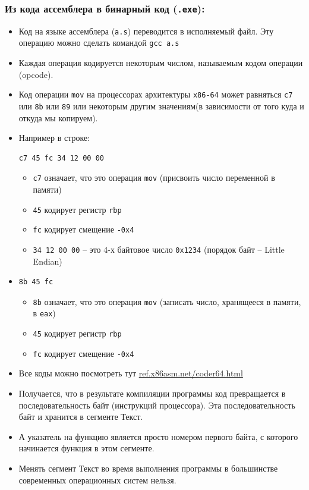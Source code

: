 \documentclass{article}
\begin{document}
\subsubsection*{Из кода ассемблера в бинарный код (\texttt{.exe}):}
\begin{itemize}
\item Код на языке ассемблера (\texttt{a.s}) переводится в исполняемый файл. Эту операцию можно сделать командой \texttt{gcc a.s}
\item Каждая операция кодируется некоторым числом, называемым кодом операции (opcode).
\item Код операции \texttt{mov} на процессорах архитектуры \texttt{x86-64} может равняться \texttt{с7} или \texttt{8b} или \texttt{89} или некоторым другим  значениям(в зависимости от того куда и откуда мы копируем).
\item Например в строке:
\begin{verbatim}
c7 45 fc 34 12 00 00
\end{verbatim}
\begin{itemize}
\item \texttt{с7} означает, что это операция \texttt{mov} (присвоить число переменной в памяти)
\item \texttt{45} кодирует регистр \texttt{rbp}
\item \texttt{fc} кодирует смещение \texttt{-0x4}
\item \texttt{34 12 00 00} -- это 4-х байтовое число \texttt{0x1234} (порядок байт -- Little Endian)
\end{itemize}

\item
\begin{verbatim}
8b 45 fc
\end{verbatim}
\begin{itemize}
\item \texttt{8b} означает, что это операция \texttt{mov} (записать число, хранящееся в памяти, в \texttt{eax})
\item \texttt{45} кодирует регистр \texttt{rbp}
\item \texttt{fc} кодирует смещение \texttt{-0x4}
\end{itemize}

\item Все коды можно посмотреть тут \href{http://ref.x86asm.net/coder64.html}{ref.x86asm.net/coder64.html}
\item Получается, что в результате компиляции программы код превращается в последовательность байт (инструкций процессора). Эта последовательность байт и хранится в сегменте Текст.
\item А указатель на функцию является просто номером первого байта, с которого начинается функция в этом сегменте.
\item Менять сегмент Текст во время выполнения программы в большинстве современных операционных систем нельзя. 
\end{itemize}
\end{document}
